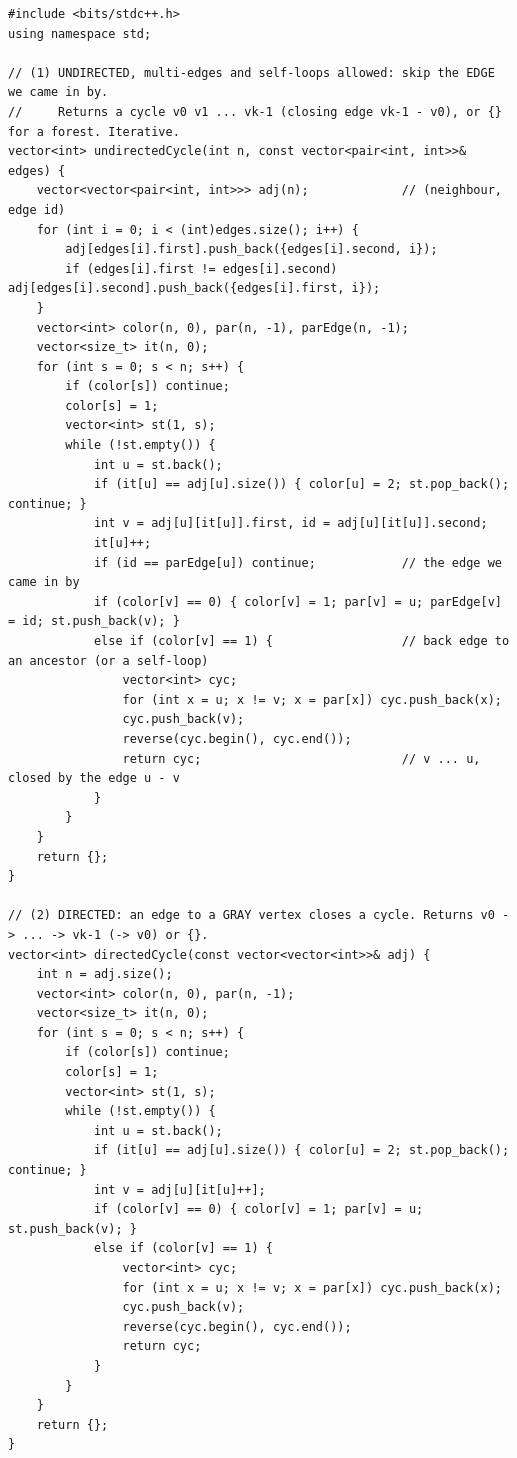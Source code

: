 \begin{lstlisting}[style=cpp]
#include <bits/stdc++.h>
using namespace std;

// (1) UNDIRECTED, multi-edges and self-loops allowed: skip the EDGE we came in by.
//     Returns a cycle v0 v1 ... vk-1 (closing edge vk-1 - v0), or {} for a forest. Iterative.
vector<int> undirectedCycle(int n, const vector<pair<int, int>>& edges) {
    vector<vector<pair<int, int>>> adj(n);             // (neighbour, edge id)
    for (int i = 0; i < (int)edges.size(); i++) {
        adj[edges[i].first].push_back({edges[i].second, i});
        if (edges[i].first != edges[i].second) adj[edges[i].second].push_back({edges[i].first, i});
    }
    vector<int> color(n, 0), par(n, -1), parEdge(n, -1);
    vector<size_t> it(n, 0);
    for (int s = 0; s < n; s++) {
        if (color[s]) continue;
        color[s] = 1;
        vector<int> st(1, s);
        while (!st.empty()) {
            int u = st.back();
            if (it[u] == adj[u].size()) { color[u] = 2; st.pop_back(); continue; }
            int v = adj[u][it[u]].first, id = adj[u][it[u]].second;
            it[u]++;
            if (id == parEdge[u]) continue;            // the edge we came in by
            if (color[v] == 0) { color[v] = 1; par[v] = u; parEdge[v] = id; st.push_back(v); }
            else if (color[v] == 1) {                  // back edge to an ancestor (or a self-loop)
                vector<int> cyc;
                for (int x = u; x != v; x = par[x]) cyc.push_back(x);
                cyc.push_back(v);
                reverse(cyc.begin(), cyc.end());
                return cyc;                            // v ... u, closed by the edge u - v
            }
        }
    }
    return {};
}

// (2) DIRECTED: an edge to a GRAY vertex closes a cycle. Returns v0 -> ... -> vk-1 (-> v0) or {}.
vector<int> directedCycle(const vector<vector<int>>& adj) {
    int n = adj.size();
    vector<int> color(n, 0), par(n, -1);
    vector<size_t> it(n, 0);
    for (int s = 0; s < n; s++) {
        if (color[s]) continue;
        color[s] = 1;
        vector<int> st(1, s);
        while (!st.empty()) {
            int u = st.back();
            if (it[u] == adj[u].size()) { color[u] = 2; st.pop_back(); continue; }
            int v = adj[u][it[u]++];
            if (color[v] == 0) { color[v] = 1; par[v] = u; st.push_back(v); }
            else if (color[v] == 1) {
                vector<int> cyc;
                for (int x = u; x != v; x = par[x]) cyc.push_back(x);
                cyc.push_back(v);
                reverse(cyc.begin(), cyc.end());
                return cyc;
            }
        }
    }
    return {};
}


\end{lstlisting}
